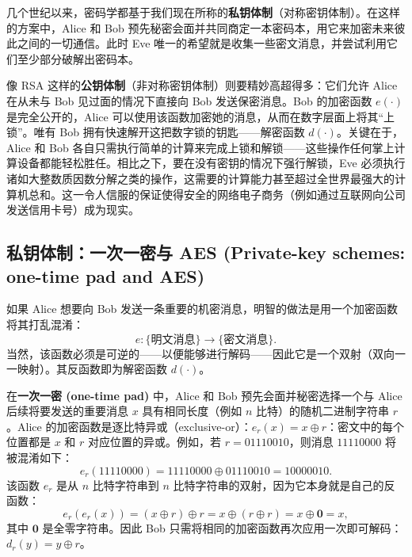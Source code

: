 几个世纪以来，密码学都基于我们现在所称的\textbf{私钥体制}（对称密钥体制）。在这样的方案中，Alice 和 Bob 预先秘密会面并共同商定一本密码本，用它来加密未来彼此之间的一切通信。此时 Eve 唯一的希望就是收集一些密文消息，并尝试利用它们至少部分破解出密码本。

像 RSA 这样的\textbf{公钥体制}（非对称密钥体制）则要精妙高超得多：它们允许 Alice 在从未与 Bob 见过面的情况下直接向 Bob 发送保密消息。Bob 的加密函数 $e(\cdot)$ 是完全公开的，Alice 可以使用该函数加密她的消息，从而在数字层面上将其“上锁”。唯有 Bob 拥有快速解开这把数字锁的钥匙——解密函数 $d(\cdot)$。关键在于，Alice 和 Bob 各自只需执行简单的计算来完成上锁和解锁——这些操作任何掌上计算设备都能轻松胜任。相比之下，要在没有密钥的情况下强行解锁，Eve 必须执行诸如大整数质因数分解之类的操作，这需要的计算能力甚至超过全世界最强大的计算机总和。这一令人信服的保证使得安全的网络电子商务（例如通过互联网向公司发送信用卡号）成为现实。

\subsection{私钥体制：一次一密与 AES (Private-key schemes: one-time pad and AES)}
如果 Alice 想要向 Bob 发送一条重要的机密消息，明智的做法是用一个加密函数将其打乱混淆：
\[
e : \{\text{明文消息}\} \to \{\text{密文消息}\}.
\]
当然，该函数必须是可逆的——以便能够进行解码——因此它是一个双射（双向一一映射）。其反函数即为解密函数 $d(\cdot)$。

在\textbf{一次一密 (one-time pad)} 中，Alice 和 Bob 预先会面并秘密选择一个与 Alice 后续将要发送的重要消息 $x$ 具有相同长度（例如 $n$ 比特）的随机二进制字符串 $r$。Alice 的加密函数是逐比特异或（exclusive-or）：$e_r(x) = x \oplus r$：密文中的每个位置都是 $x$ 和 $r$ 对应位置的异或。例如，若 $r = 01110010$，则消息 $11110000$ 将被混淆如下：
\[
e_r(11110000) = 11110000 \oplus 01110010 = 10000010.
\]
该函数 $e_r$ 是从 $n$ 比特字符串到 $n$ 比特字符串的双射，因为它本身就是自己的反函数：
\[
e_r(e_r(x)) = (x \oplus r) \oplus r = x \oplus (r \oplus r) = x \oplus \bm{0} = x,
\]
其中 $\bm{0}$ 是全零字符串。因此 Bob 只需将相同的加密函数再次应用一次即可解码：$d_r(y) = y \oplus r$。

